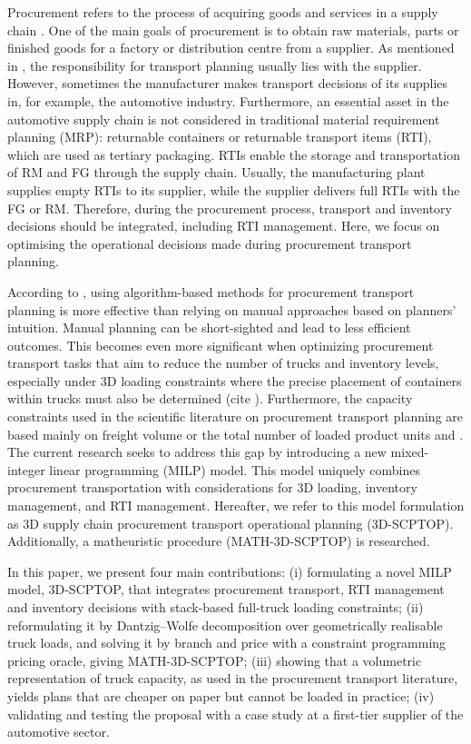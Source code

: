 Procurement refers to the process of acquiring goods and services in a supply chain \autocite{Chopra2015SupplyOperation}. One of the main goals of procurement is to obtain raw materials, parts or finished goods for a factory or distribution centre from a supplier. As mentioned in \autocite{Fleischmann2015TransportDistribution}, the responsibility for transport planning usually lies with the supplier. However, sometimes the manufacturer makes transport decisions of its supplies in, for example, the automotive industry. Furthermore, an essential asset in the automotive supply chain is not considered in traditional material requirement planning (MRP): returnable containers or returnable transport items (RTI), which are used as tertiary packaging. RTIs enable the storage and transportation of RM and FG through the supply chain. Usually, the manufacturing plant supplies empty RTIs to its supplier, while the supplier delivers full RTIs with the FG or RM. Therefore, during the procurement process, transport and inventory decisions should be integrated, including RTI management. Here, we focus on optimising the operational decisions made during procurement transport planning.

According to \autocite{Diaz-Madronero2014AChain}, using algorithm-based methods for procurement transport planning is more effective than relying on manual approaches based on planners' intuition. Manual planning can be short-sighted and lead to less efficient outcomes. This becomes even more significant when optimizing procurement transport tasks that aim to reduce the number of trucks and inventory levels, especially under 3D loading constraints where the precise placement of containers within trucks must also be determined (cite ).
Furthermore, the capacity constraints used in the scientific literature on procurement transport planning are based mainly on freight volume or the total number of loaded product units  {\autocite{Hashemi-Amiri2023IntegratedApproach} and \autocite{Diaz-Madronero2014AChain}.} The current research seeks to address this gap by introducing a new mixed-integer linear programming (MILP) model. This model uniquely combines procurement transportation with considerations for 3D loading, inventory management, and RTI management. Hereafter, we refer to this model formulation as 3D supply chain procurement transport operational planning (3D-SCPTOP). Additionally,  a matheuristic procedure (MATH-3D-SCPTOP)  is researched.



{\color{blue}

In this paper, we present four main contributions: (i) formulating a novel MILP model, 3D-SCPTOP, that integrates procurement transport, RTI management and inventory decisions with stack-based full-truck loading constraints; (ii) reformulating it by Dantzig--Wolfe decomposition over geometrically realisable truck loads, and solving it by branch and price with a constraint programming pricing oracle, giving MATH-3D-SCPTOP; (iii) showing that a volumetric representation of truck capacity, as used in the procurement transport literature, yields plans that are cheaper on paper but cannot be loaded in practice; (iv) validating and testing the proposal with a case study at a first-tier supplier of the automotive sector.
}


